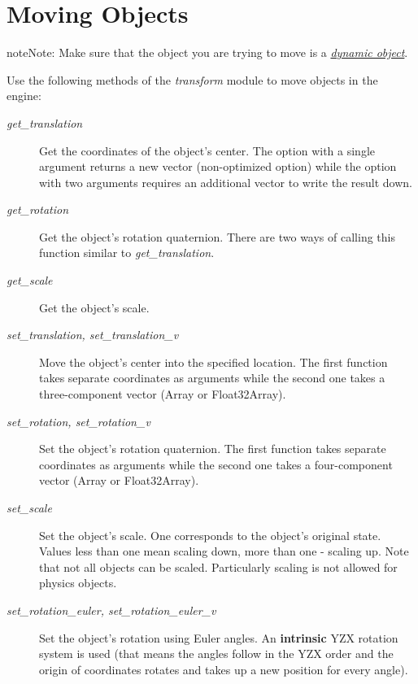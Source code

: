 \documentclass[a4paper,12pt,oneside]{sphinxmanual}
\begin{document}
\section{Moving Objects}
\label{developers:id5}
\begin{notice}{note}{Note:}
Make sure that the object you are trying to move is a {\hyperref[objects:static-dynamic-objects]{\emph{dynamic object}}}.
\end{notice}

Use the following methods of the \emph{transform} module to move objects in the engine:
\begin{description}
\item[{\emph{get\_translation}}] \leavevmode
Get the coordinates of the object's center. The option with a single argument returns a new vector (non-optimized option) while the option with two arguments requires an additional vector to write the result down.

\item[{\emph{get\_rotation}}] \leavevmode
Get the object's rotation quaternion. There are two ways of calling this function similar to \emph{get\_translation}.

\item[{\emph{get\_scale}}] \leavevmode
Get the object's scale.

\item[{\emph{set\_translation, set\_translation\_v}}] \leavevmode
Move the object's center into the specified location. The first function takes separate coordinates as arguments while the second one takes a three-component vector (Array or Float32Array).

\item[{\emph{set\_rotation, set\_rotation\_v}}] \leavevmode
Set the object's rotation quaternion. The first function takes separate coordinates as arguments while the second one takes a four-component vector (Array or Float32Array).

\item[{\emph{set\_scale}}] \leavevmode
Set the object's scale. One corresponds to the object's original state. Values less than one mean scaling down, more than one - scaling up. Note that not all objects can be scaled. Particularly scaling is not allowed for physics objects.

\item[{\emph{set\_rotation\_euler, set\_rotation\_euler\_v}}] \leavevmode
Set the object's rotation using Euler angles. An \textbf{intrinsic} YZX rotation system is used (that means the angles follow in the YZX order and the origin of coordinates rotates and takes up a new position for every angle).

\end{description}
\end{document}
